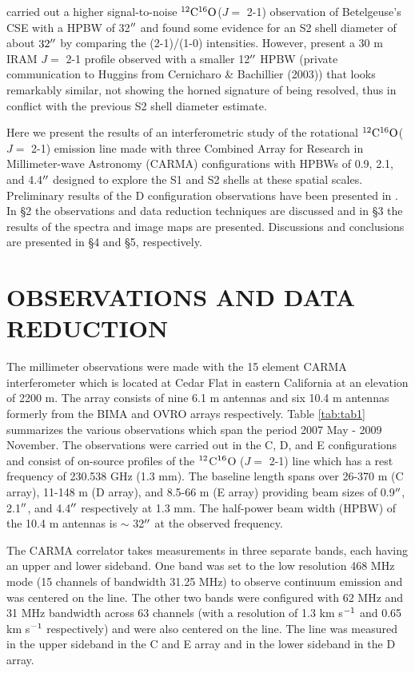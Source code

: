 \documentclass[apj]{emulateapj}
\begin{document}
\cite{1987ApJ...313..400H} carried out a higher signal-to-noise $\rm{{}^{12}C^{16}O}$($J=$ 2-1) observation of Betelgeuse's CSE with a  HPBW of 32$\mbox{$^{\prime\prime}$}$ and found some evidence for an S2 shell diameter of about $32\mbox{$^{\prime\prime}$}$ by comparing the  (2-1)/(1-0) intensities. However, \cite{1994ApJ...424L.127H} present a 30 m IRAM $J=$ 2-1 profile observed with a smaller 12$\mbox{$^{\prime\prime}$}$ HPBW (private communication to Huggins from Cernicharo \& Bachillier (2003)) that  looks remarkably similar, not showing the horned signature of being resolved, thus in conflict with the previous S2 shell diameter estimate.

Here we present the results of an interferometric study of the rotational $\rm{{}^{12}C^{16}O}$($J=$ 2-1) emission line made with three Combined Array for Research in Millimeter-wave Astronomy (CARMA) configurations with HPBWs of 0.9, 2.1, and 4.4$\mbox{$^{\prime\prime}$}$ designed to explore the S1 and S2 shells at these spatial scales.  Preliminary results of the D configuration observations have been presented in \cite{2009AIPC.1094..868H}. In \S2 the observations and data reduction techniques are discussed and in \S3 the results of the spectra and image maps are presented. Discussions and conclusions are presented in \S4 and \S5, respectively.

\section{OBSERVATIONS AND DATA REDUCTION}

The millimeter observations were made with the 15 element CARMA interferometer \citep{2004ASPC..314..768S} which is located at Cedar Flat in eastern California at an elevation of 2200 m. The array consists of nine 6.1 m antennas and six 10.4 m antennas formerly from the BIMA and OVRO arrays respectively. Table \ref{tab:tab1} summarizes the various observations which span the period 2007 May - 2009 November. The observations were carried out in the C, D, and E configurations and consist of on-source profiles of the $\rm{{}^{12}}$C$\rm{{}^{16}}$O ($J=$ 2-1) line which has a rest frequency of 230.538 GHz (1.3 mm). The baseline length spans over 26-370 m (C array), 11-148 m (D array), and 8.5-66 m (E array) providing beam sizes of 0.9$\mbox{$^{\prime\prime}$}$, 2.1$\mbox{$^{\prime\prime}$}$, and 4.4$\mbox{$^{\prime\prime}$}$ respectively at 1.3 mm. The half-power beam width (HPBW) of the 10.4 m antennas is $\sim$ 32$\mbox{$^{\prime\prime}$}$ at the observed frequency.

The CARMA correlator takes measurements in three separate bands, each having an upper and lower sideband. One band was set to the low resolution 468 MHz mode (15 channels of bandwidth 31.25 MHz) to observe continuum emission and was centered on the line. The other two bands were configured with 62 MHz and 31 MHz bandwidth across 63 channels (with a resolution of 1.3 km s$\rm{{}^{-1}}$ and 0.65 km s$\rm{{}^{-1}}$ respectively) and were also centered on the line. The line was measured in the upper sideband in the C and E array and in the lower sideband in the D array.
\end{document}
